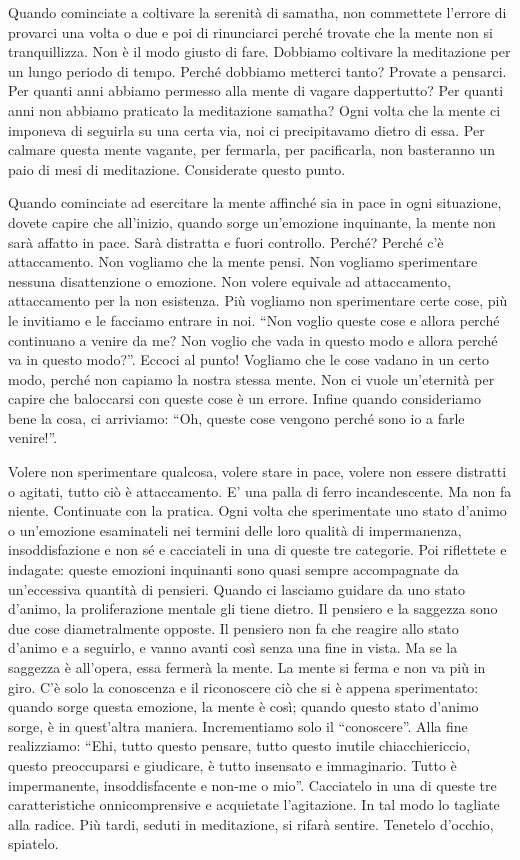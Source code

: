 Quando cominciate a coltivare la serenità di samatha, non commettete
l'errore di provarci una volta o due e poi di rinunciarci perché trovate
che la mente non si tranquillizza. Non è il modo giusto di fare.
Dobbiamo coltivare la meditazione per un lungo periodo di tempo. Perché
dobbiamo metterci tanto? Provate a pensarci. Per quanti anni abbiamo
permesso alla mente di vagare dappertutto? Per quanti anni non abbiamo
praticato la meditazione samatha? Ogni volta che la mente ci imponeva di
seguirla su una certa via, noi ci precipitavamo dietro di essa. Per
calmare questa mente vagante, per fermarla, per pacificarla, non
basteranno un paio di mesi di meditazione. Considerate questo punto.

Quando cominciate ad esercitare la mente affinché sia in pace in ogni
situazione, dovete capire che all'inizio, quando sorge un'emozione
inquinante, la mente non sarà affatto in pace. Sarà distratta e fuori
controllo. Perché? Perché c'è attaccamento. Non vogliamo che la mente
pensi. Non vogliamo sperimentare nessuna disattenzione o emozione. Non
volere equivale ad attaccamento, attaccamento per la non esistenza. Più
vogliamo non sperimentare certe cose, più le invitiamo e le facciamo
entrare in noi. ``Non voglio queste cose e allora perché continuano a
venire da me? Non voglio che vada in questo modo e allora perché va in
questo modo?''. Eccoci al punto! Vogliamo che le cose vadano in un certo
modo, perché non capiamo la nostra stessa mente. Non ci vuole
un'eternità per capire che baloccarsi con queste cose è un errore.
Infine quando consideriamo bene la cosa, ci arriviamo: ``Oh, queste cose
vengono perché sono io a farle venire!''.

Volere non sperimentare qualcosa, volere stare in pace, volere non
essere distratti o agitati, tutto ciò è attaccamento. E' una palla di
ferro incandescente. Ma non fa niente. Continuate con la pratica. Ogni
volta che sperimentate uno stato d'animo o un'emozione esaminateli nei
termini delle loro qualità di impermanenza, insoddisfazione e non sé e
cacciateli in una di queste tre categorie. Poi riflettete e indagate:
queste emozioni inquinanti sono quasi sempre accompagnate da
un'eccessiva quantità di pensieri. Quando ci lasciamo guidare da uno
stato d'animo, la proliferazione mentale gli tiene dietro. Il pensiero e
la saggezza sono due cose diametralmente opposte. Il pensiero non fa che
reagire allo stato d'animo e a seguirlo, e vanno avanti così senza una
fine in vista. Ma se la saggezza è all'opera, essa fermerà la mente. La
mente si ferma e non va più in giro. C'è solo la conoscenza e il
riconoscere ciò che si è appena sperimentato: quando sorge questa
emozione, la mente è così; quando questo stato d'animo sorge, è in
quest'altra maniera. Incrementiamo solo il ``conoscere''. Alla fine
realizziamo: ``Ehi, tutto questo pensare, tutto questo inutile
chiacchiericcio, questo preoccuparsi e giudicare, è tutto insensato e
immaginario. Tutto è impermanente, insoddisfacente e non-me o mio''.
Cacciatelo in una di queste tre caratteristiche onnicomprensive e
acquietate l'agitazione. In tal modo lo tagliate alla radice. Più tardi,
seduti in meditazione, si rifarà sentire. Tenetelo d'occhio, spiatelo.

